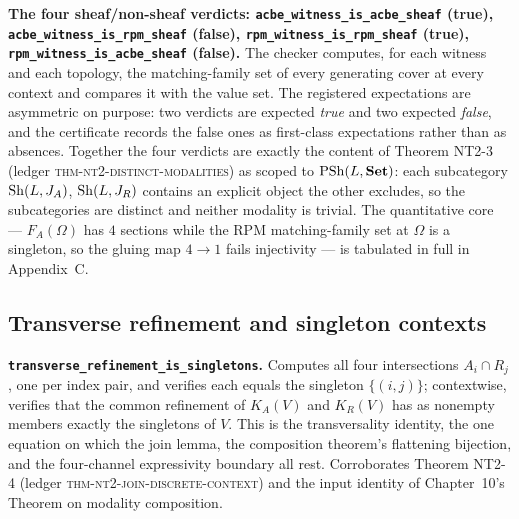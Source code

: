 \begin{checkclass}
\label{ch11:chk:verdicts}
\textbf{The four sheaf/non-sheaf verdicts:
\texttt{acbe\_\allowbreak witness\_\allowbreak is\_\allowbreak acbe\_\allowbreak sheaf} (true),
\texttt{acbe\_\allowbreak witness\_\allowbreak is\_\allowbreak rpm\_\allowbreak sheaf} (false),
\texttt{rpm\_\allowbreak witness\_\allowbreak is\_\allowbreak rpm\_\allowbreak sheaf} (true),
\texttt{rpm\_\allowbreak witness\_\allowbreak is\_\allowbreak acbe\_\allowbreak sheaf} (false).} The checker computes, for
each witness and each topology, the matching-family set of every generating
cover at every context and compares it with the value set. The registered
expectations are asymmetric on purpose: two verdicts are expected
\emph{true} and two expected \emph{false}, and the certificate records the
false ones as first-class expectations rather than as absences. Together the
four verdicts are exactly the content of Theorem NT2-3 (ledger
\textsc{thm-nt2-distinct-modalities}) as scoped to $\mathrm{PSh}(L, \mathbf{Set})$: each
subcategory $\mathrm{Sh}(L, J_A)$, $\mathrm{Sh}(L, J_R)$ contains an explicit object the
other excludes, so the subcategories are distinct and neither modality is
trivial. The quantitative core --- $F_A(\Omega)$ has $4$ sections while the
RPM matching-family set at $\Omega$ is a singleton, so the gluing map
$4 \to 1$ fails injectivity --- is tabulated in full in Appendix~C.
\end{checkclass}

\subsection{Transverse refinement and singleton contexts}
\label{ch11:sec:refinement}

\begin{checkclass}
\label{ch11:chk:transverse}
\textbf{\texttt{transverse\_refinement\_is\_singletons}.} Computes all
four intersections $A_i \cap R_j$, one per index pair, and verifies
each equals the singleton $\{(i, j)\}$; contextwise, verifies that the
common refinement of $K_A(V)$ and $K_R(V)$ has as nonempty members exactly
the singletons of $V$. This is the transversality identity, the one equation
on which the join lemma, the composition theorem's flattening bijection, and
the four-channel expressivity boundary all rest. Corroborates Theorem NT2-4
(ledger \textsc{thm-nt2-join-discrete-context}) and the input identity of
Chapter~10's Theorem on modality composition.
\end{checkclass}

